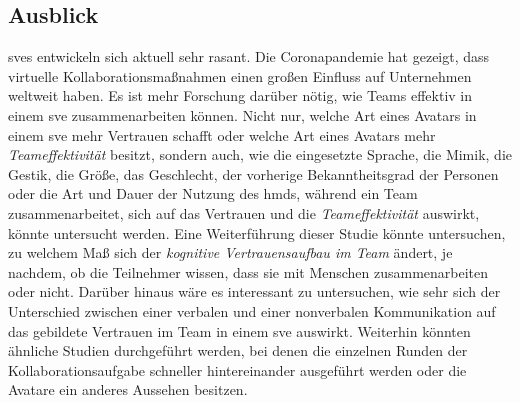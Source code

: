 \documentclass[a4paper,11pt]{article}%
\renewcommand{\\}{\vspace*{0.5\baselineskip} \newline}
\begin{document}
{{\subsection{Ausblick}
\ac{sve}s entwickeln sich aktuell sehr rasant. Die Coronapandemie hat gezeigt, dass virtuelle Kollaborationsmaßnahmen einen großen Einfluss auf Unternehmen weltweit haben. Es ist mehr Forschung darüber nötig, wie Teams effektiv in einem \ac{sve} zusammenarbeiten können. Nicht nur, welche Art eines Avatars in einem \ac{sve} mehr Vertrauen schafft oder welche Art eines Avatars mehr \textit{Teameffektivität} besitzt, sondern auch, wie die eingesetzte Sprache, die Mimik, die Gestik, die Größe, das Geschlecht, der vorherige Bekanntheitsgrad der Personen oder die Art und Dauer der Nutzung des \ac{hmd}s, während ein Team zusammenarbeitet, sich auf das Vertrauen und die \textit{Teameffektivität} auswirkt, könnte untersucht werden. Eine Weiterführung dieser Studie könnte untersuchen, zu welchem Maß sich der \textit{kognitive Vertrauensaufbau im Team} ändert, je nachdem, ob die Teilnehmer wissen, dass sie mit Menschen zusammenarbeiten oder nicht. Darüber hinaus wäre es interessant zu untersuchen, wie sehr sich der Unterschied zwischen einer verbalen und einer nonverbalen Kommunikation auf das gebildete Vertrauen im Team in einem \ac{sve} auswirkt.  
Weiterhin könnten ähnliche Studien durchgeführt werden, bei denen die einzelnen Runden der Kollaborationsaufgabe schneller hintereinander ausgeführt werden oder die Avatare ein anderes Aussehen besitzen.

%
%
%
\clearpage
\newpage
}}
\end{document}
